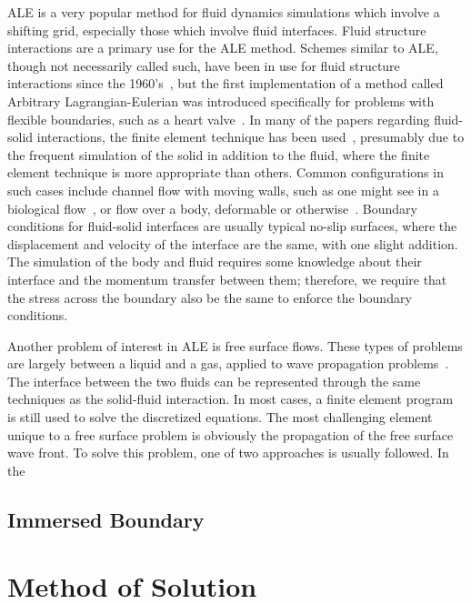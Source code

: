 \documentclass{article}
\begin{document}
ALE is a very popular method for fluid dynamics simulations which involve a shifting grid, especially those which involve fluid interfaces.  Fluid structure interactions are a primary use for the ALE method.  Schemes similar to ALE, though not necessarily called such, have been in use for fluid structure interactions since the 1960's~\cite{noh63,trulio66}, but the first implementation of a method called Arbitrary Lagrangian-Eulerian was introduced specifically for problems with flexible boundaries, such as a heart valve~\cite{hirt74}.  In many of the papers regarding fluid-solid interactions, the finite element technique has been used~\cite{hron06,letallec01,souli00}, presumably due to the frequent simulation of the solid in addition to the fluid, where the finite element technique is more appropriate than others.  Common configurations in such cases include channel flow with moving walls, such as one might see in a biological flow~\cite{hron06}, or flow over a body, deformable or otherwise~\cite{farhat05}.  Boundary conditions for fluid-solid interfaces are usually typical no-slip surfaces, where the displacement and velocity of the interface are the same, with one slight addition.  The simulation of the body and fluid requires some knowledge about their interface and the momentum transfer between them; therefore, we require that the stress across the boundary also be the same to enforce the boundary conditions.

Another problem of interest in ALE is free surface flows.  These types of problems are largely between a liquid and a gas, applied to wave propagation problems~\cite{braess00,lo04,nithiarasu05}.  The interface between the two fluids can be represented through the same techniques as the solid-fluid interaction.  In most cases, a finite element program is still used to solve the discretized equations.  The most challenging element unique to a free surface problem is obviously the propagation of the free surface wave front.  To solve this problem, one of two approaches is usually followed.  In the 

\subsection{Immersed Boundary}



\section{Method of Solution}
\end{document}
